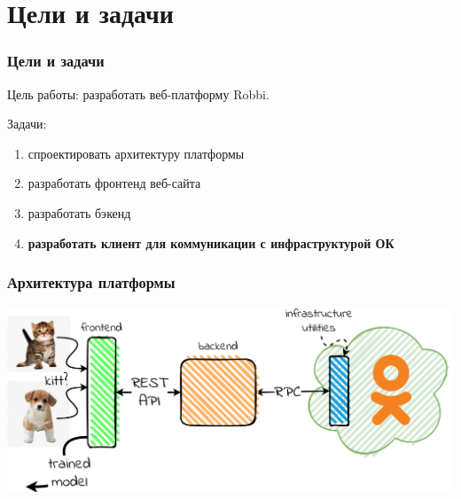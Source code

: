 \section{Цели и задачи}
\begin{frame}
\frametitle{Цели и задачи}
Цель работы: разработать веб-платформу Robbi.

Задачи:
\begin{enumerate}
    \item спроектировать архитектуру платформы
    \item разработать фронтенд веб-сайта
    \item разработать бэкенд
    \item \textbf{разработать клиент для коммуникации с инфраструктурой ОК}
\end{enumerate}
\end{frame}

\begin{frame}
\frametitle{Архитектура платформы}
\includegraphics[width=\textwidth]{architecture.png}
\end{frame}
